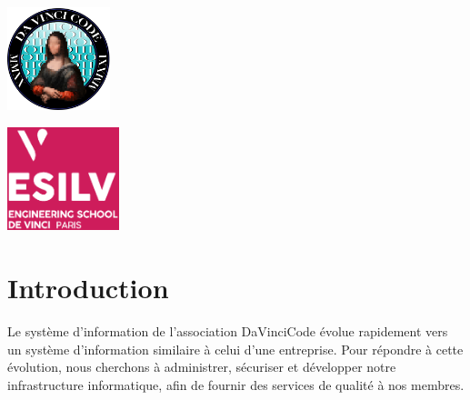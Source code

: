 \documentclass[12pt]{article}
\begin{document}
    \backgroundpages
    \setlength{\columnsep}{-4cm}
    \begin{multicols}{3}\raggedbottom\color{white}
        \noindent
        \parbox[t][45mm][t]{\columnwidth}{\setlength{\parindent}{1em}
        \vspace*{-18mm}
        \includegraphics[height=30mm]{davincicode}
        }

        \noindent
        \parbox[c][40mm][c]{\columnwidth}{\setlength{\parindent}{0em}
        \centering
        \shadowoffsetx{1pt}
        \shadowoffsety{0pt}
        \vspace*{-38mm}
        \vspace{0.7cm}
        \vspace{0.2cm}
        }

        \parbox[t][45mm][t]{\columnwidth}{\setlength{\parindent}{12em}
        \vspace*{-18mm}
        \includegraphics[height=30mm]{esilv}
        }
        

    \end{multicols}
    \vspace*{-30mm}
    \raggedbottom
    
    \section{Introduction}   
    Le système d'information de l'association DaVinciCode évolue rapidement vers un système d'information similaire à celui d'une entreprise. Pour répondre à cette évolution, nous cherchons à administrer, sécuriser et développer notre infrastructure informatique, afin de fournir des services de qualité à nos membres.
    \bigskip
\end{document}
